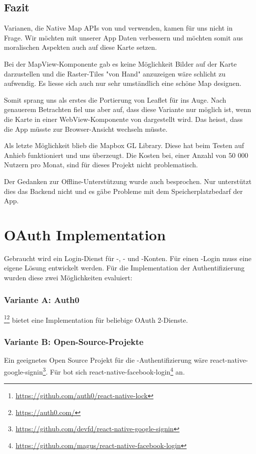 \subsection{Fazit}
Varianen, die Native Map APIs von  und  verwenden, kamen für uns nicht in Frage.
Wir möchten mit unserer App  Daten verbessern und möchten somit aus moralischen Aspekten auch auf diese Karte setzen. 

Bei der  MapView-Komponente gab es keine Möglichkeit Bilder auf der Karte darzustellen und die Raster-Tiles "von Hand" anzuzeigen wäre schlicht zu aufwendig. 
Es liesse sich auch nur sehr umständlich eine schöne Map designen.

Somit sprang uns als erstes die Portierung von Leaflet für  ins Auge. 
Nach genauerem Betrachten fiel uns aber auf, dass diese Variante nur möglich ist, wenn die Karte in einer WebView-Komponente von  dargestellt wird. 
Das heisst, dass die App müsste zur Browser-Ansicht wechseln müsste.

Als letzte Möglichkeit blieb die Mapbox GL Library.
Diese hat beim Testen auf Anhieb funktioniert und uns überzeugt.
Die Kosten bei, einer Anzahl von 50 000 Nutzern pro Monat, sind für dieses Projekt nicht problematisch.\cite{mapbox-pricing}

Der Gedanken zur Offline-Unterstützung wurde auch besprochen.
Nur unterstützt dies das Backend nicht und es gäbe Probleme mit dem Speicherplatzbedarf der App. 


\section{OAuth Implementation}
Gebraucht wird ein Login-Dienst für -, - und -Konten. 
Für einen -Login muss eine eigene Lösung entwickelt werden. 
Für die Implementation der Authentifizierung wurden diese zwei Möglichkeiten evaluiert:


\subsubsection{Variante A: Auth0}
\footnote{\url{https://github.com/auth0/react-native-lock}}\footnote{\url{https://auth0.com/}} bietet eine Implementation für beliebige \gls{OAuth} 2-Dienste. 


\subsubsection{Variante B: Open-Source-Projekte}
Ein geeignetes Open Source Projekt für die -Authentifizierung wäre react-native-google-signin\footnote{\url{https://github.com/devfd/react-native-google-signin}}. 
Für  bot sich react-native-facebook-login\footnote{\url{https://github.com/magus/react-native-facebook-login}} an. 


